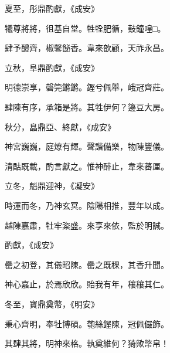 \begin{pinyinscope}
 夏至，彤鼎酌獻，《成安》



 犧尊將將，徂基自堂。牲牷肥循，鼓鐘喤□。



 肆予醴齊，椒馨飶香。韋來歆顧，天祚永昌。



 立秋，阜鼎酌獻，《成安》



 明德崇享，磬筦鏘鏘。鏗兮佩舉，峨冠齊莊。



 肆陳有序，承箱是將。其牲伊何？籩豆大房。



 秋分，皛鼎亞、終獻，《成安》



 神宮巍巍，庭燎有輝。聲諧備樂，物陳豐儀。



 清酤既載，酌言獻之。惟神醉止，韋來蕃厘。



 立冬，魁鼎迎神，《凝安》



 時運而冬，乃神玄冥。陰陽相推，豐年以成。



 越陳嘉肅，牡牢粢盛。來享來依，監於明誠。



 酌獻，《成安》



 罍之初登，其儀昭陳。罍之既稞，其香升聞。



 神心嘉止，於焉欣欣。貽我有年，穰穰其仁。



 冬至，寶鼎奠幣，《明安》



 秉心齊明，奉牡博碩。匏絲鏗陳，冠佩儼飾。



 其肆其將，明神來格。執奠維何？猗歟幣帛！



\end{pinyinscope}